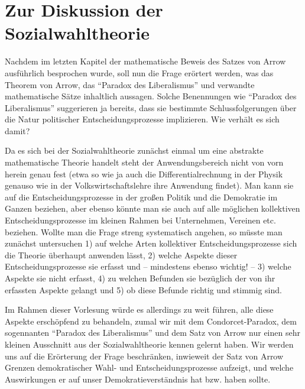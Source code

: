 \section{Zur Diskussion der Sozialwahltheorie}
\label{SozialwahltheorieDiskussion}

Nachdem im letzten Kapitel der mathematische Beweis des Satzes von Arrow
ausführlich besprochen wurde, soll nun die Frage erörtert werden, was das Theorem
von Arrow, das "`Paradox des Liberalismus"' und verwandte mathematische Sätze
inhaltlich aussagen. Solche Benennungen wie "`Paradox des Liberalismus"'
suggerieren ja bereits, dass sie bestimmte Schlussfolgerungen über die Natur
politischer Entscheidungsprozesse implizieren. Wie verhält es sich damit?

Da es sich bei der Sozialwahltheorie zunächst einmal um eine abstrakte
mathematische Theorie handelt steht der Anwendungsbereich nicht von vorn herein
genau fest (etwa so wie ja auch die Differentialrechnung in der Physik genauso
wie in der Volkswirtschaftslehre ihre Anwendung findet). Man kann sie auf die
Entscheidungsprozesse in der großen Politik und die Demokratie im Ganzen
beziehen, aber ebenso könnte man sie auch auf alle möglichen kollektiven
Entscheidungsprozesse im kleinen Rahmen bei Unternehmen, Vereinen etc. beziehen.
Wollte man die Frage streng systematisch angehen, so müsste man zunächst
untersuchen 1) auf welche Arten kollektiver Entscheidungsprozesse sich die
Theorie überhaupt anwenden lässt, 2) welche Aspekte dieser Entscheidungsprozesse
sie erfasst und -- mindestens ebenso wichtig! -- 3) welche Aspekte sie nicht
erfasst, 4) zu welchen Befunden sie bezüglich der von ihr erfassten Aspekte
gelangt und 5) ob diese Befunde richtig und stimmig sind.

Im Rahmen dieser Vorlesung würde es allerdings zu weit führen, alle diese Aspekte
erschöpfend zu behandeln, zumal wir mit dem Condorcet-Paradox, dem sogennanten
"`Paradox des Liberalismus"' und dem Satz von Arrow nur einen sehr kleinen
Ausschnitt aus der Sozialwahltheorie kennen gelernt haben. Wir werden uns auf die
Erörterung der Frage beschränken, inwieweit der Satz von Arrow Grenzen
demokratischer Wahl- und Entscheidungsprozesse aufzeigt, und welche Auswirkungen
er auf unser Demokratieverständnis hat bzw. haben sollte.

